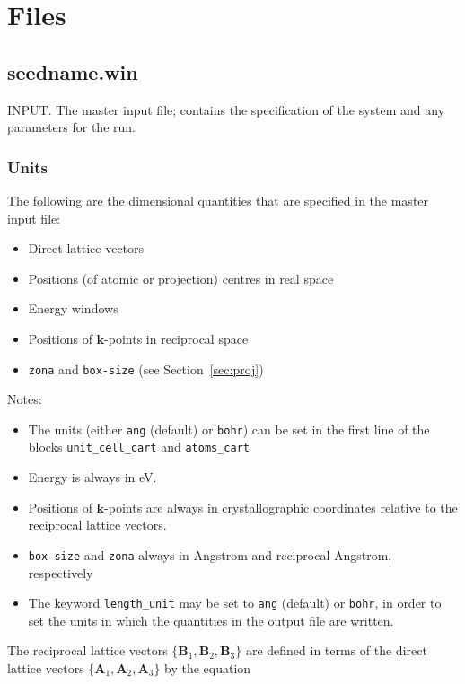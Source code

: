 \chapter{Files}


\section{seedname.win}
INPUT. The master input file; contains the specification of the system
and any parameters for the run. 

\subsection{Units}

The following are the dimensional quantities that are
specified in the master input file:

\begin{itemize}
\item Direct lattice vectors
\item Positions (of atomic or projection) centres in real space
\item Energy windows
\item Positions of $\mathbf{k}$-points in reciprocal space
\item \verb#zona# and \verb#box-size# (see Section~\ref{sec:proj})
\end{itemize}

Notes:

\begin{itemize}
\item The units (either \verb#ang#
  (default) or \verb#bohr#) can be set in the first line of the blocks \verb#unit_cell_cart# and \verb#atoms_cart#
\item Energy is always in eV.
\item Positions of $\mathbf{k}$-points are always in crystallographic
  coordinates
relative to the reciprocal lattice vectors.
\item \verb#box-size# and \verb#zona# always in Angstrom and
  reciprocal Angstrom, respectively
\item The keyword \verb#length_unit# may be set to \verb#ang#
  (default) or \verb#bohr#, in order to set the units in which the
  quantities in the output file are written.
\end{itemize}

The reciprocal lattice vectors
$\{\mathbf{B}_{1},\mathbf{B}_{2},\mathbf{B}_{3}\}$ are defined in
terms
of the direct lattice vectors
$\{\mathbf{A}_{1},\mathbf{A}_{2},\mathbf{A}_{3}\}$ by the equation

